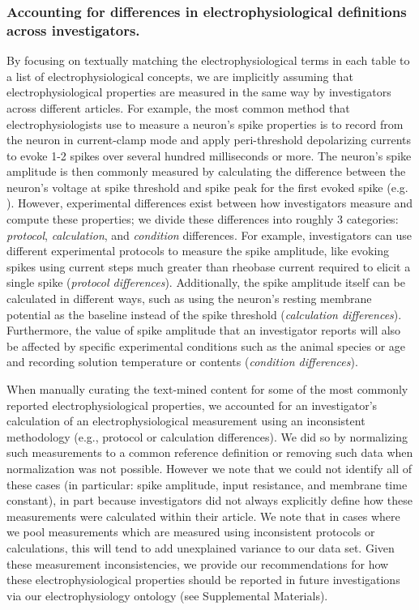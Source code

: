 \documentclass{template/frontiersSCNS} %
\begin{document}
\subsubsection{Accounting for differences in electrophysiological definitions across investigators.}
By focusing on textually matching the electrophysiological terms in each table to a list of electrophysiological concepts, we are implicitly assuming that electrophysiological properties are measured in the same way by investigators across different articles.  
For example, the most common method that electrophysiologists use to measure a neuron's spike properties is to record from the neuron in current-clamp mode and apply peri-threshold depolarizing currents to evoke 1-2 spikes over several hundred milliseconds or more.  
The neuron's spike amplitude is then commonly measured by calculating the difference between the neuron's voltage at spike threshold and spike peak for the first evoked spike (e.g. \citep{connors_electrophysiological_1982,toledo-rodriguez_correlation_2004}).  
However, experimental differences exist between how investigators measure and compute these properties; 
we divide these differences into roughly 3 categories: \textit{protocol}, \textit{calculation}, and \textit{condition} differences.  
For example, investigators can use different experimental protocols to measure the spike amplitude, like evoking spikes using current steps much greater than rheobase current required to elicit a single spike (\textit{protocol differences}).  
Additionally, the spike amplitude itself can be calculated in different ways, such as using the neuron's resting membrane potential as the baseline instead of the spike threshold (\textit{calculation differences}).  
Furthermore, the value of spike amplitude that an investigator reports will also be affected by specific experimental conditions such as the animal species or age and recording solution temperature or contents (\textit{condition differences}).

When manually curating the text-mined content for some of the most commonly reported electrophysiological properties, we accounted for an investigator's calculation of an electrophysiological measurement using an inconsistent methodology (e.g., protocol or calculation differences). 
We did so by normalizing such measurements to a common reference definition or removing such data when normalization was not possible.
However we note that we could not identify all of these cases (in particular: spike amplitude, input resistance, and membrane time constant), in part because investigators did not always explicitly define how these measurements were calculated within their article.  
We note that in cases where we pool measurements which are measured using inconsistent protocols or calculations, this will tend to add unexplained variance to our data set.  
Given these measurement inconsistencies, we provide our recommendations for how these electrophysiological properties should be reported in future investigations via our electrophysiology ontology (see Supplemental Materials).  
\end{document}
